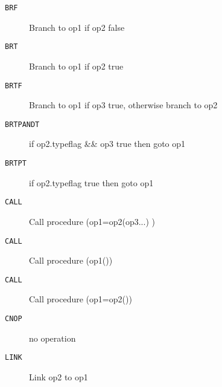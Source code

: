 \begin{description}
\item[\texttt{BRF}]  Branch to op1 if op2 false\\

\end{description}
\begin{description}
\item[\texttt{BRT}]  Branch to op1 if op2 true\\

\end{description}
\begin{description}
\item[\texttt{BRTF}]  Branch to op1 if op3 true, otherwise branch to op2\\

\end{description}
\begin{description}
\item[\texttt{BRTPANDT}]  if op2.typeflag \&\& op3 true then goto op1\\

\end{description}
\begin{description}
\item[\texttt{BRTPT}]  if op2.typeflag true then goto op1\\

\end{description}
\begin{description}
\item[\texttt{CALL}]  Call procedure (op1=op2(op3...) )\\

\end{description}
\begin{description}
\item[\texttt{CALL}]  Call procedure (op1())\\

\end{description}
\begin{description}
\item[\texttt{CALL}]  Call procedure (op1=op2())\\

\end{description}
\begin{description}
\item[\texttt{CNOP}]  no operation\\

\end{description}
\begin{description}
\item[\texttt{LINK}]  Link op2 to op1\\

\end{description}
